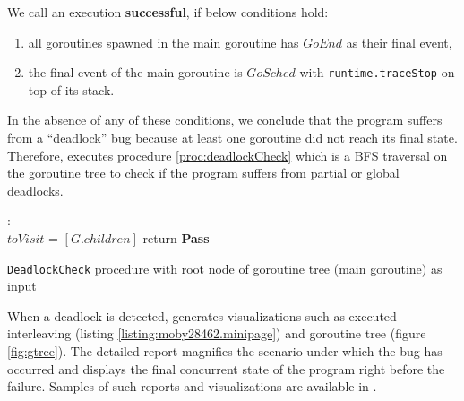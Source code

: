 We call an execution \textbf{successful}, if below conditions hold:
\begin{enumerate}
  \item all goroutines spawned in the main goroutine has $GoEnd$ as their final event,
  \item the final event of the main goroutine is $GoSched$ with \texttt{runtime.traceStop} on top of its stack.
\end{enumerate}

In the absence of any of these conditions, we conclude that the program suffers from a ``deadlock'' bug because at least one goroutine did not reach its final state.
%
Therefore, \goat executes procedure \ref{proc:deadlockCheck} which is a BFS traversal on the goroutine tree to check if the program suffers from partial or global deadlocks.


\begin{small}
\begin{algorithm}[]
 \DontPrintSemicolon
 :{\\
 \Indp
    $toVisit$ = $[G.children]$\;
      return \textbf{Pass}\;
  }
 \caption{\texttt{DeadlockCheck} procedure with root node of goroutine tree (main goroutine) as input}
 \label{proc:deadlockCheck}
\end{algorithm}
\end{small}



When a deadlock is detected, \goat generates visualizations such as executed interleaving (listing \ref{listing:moby28462.minipage}) and goroutine tree (figure \ref{fig:gtree}).
%
The detailed report magnifies the scenario under which the bug has occurred and displays the final concurrent state of the program right before the failure.
%
Samples of such reports and visualizations are available in \cite{iiswc_goat_visualizations}.



